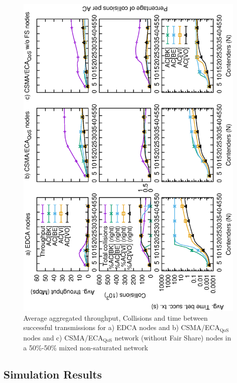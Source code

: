 \begin{figure}[t]
	\centering
		\includegraphics[width=0.55\linewidth,angle = -90]{figures/multiplot-combined-unsat-error-0-1.eps}
		\caption{Average aggregated throughput, Collisions and time between successful transmissions for a) EDCA nodes and b) CSMA/ECA$_{\text{QoS}}$ nodes and c) CSMA/ECA$_{\text{QoS}}$ network (without Fair Share) nodes in a 50\%-50\% mixed non-saturated network}
		\label{fig:multiplotCombinedUnsat}
\end{figure}

\subsection{Simulation Results}\label{sim:results}
